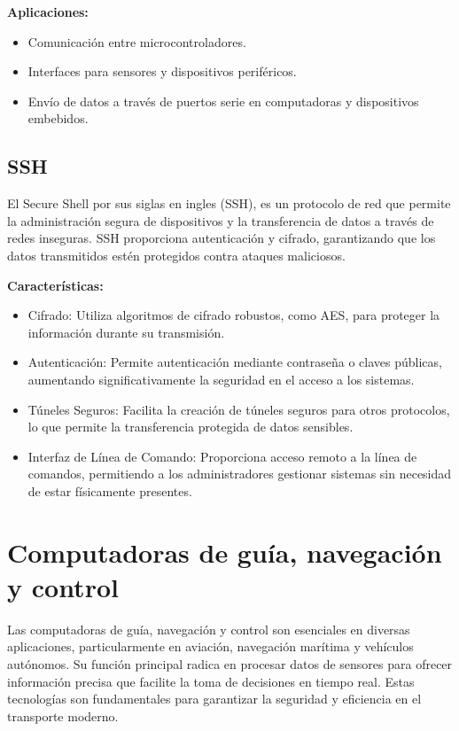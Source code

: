 \textbf{Aplicaciones:}

\begin{itemize}
    \item Comunicación entre microcontroladores.
    \item Interfaces para sensores y dispositivos periféricos.
    \item Envío de datos a través de puertos serie en computadoras y dispositivos embebidos.
\end{itemize}

\subsection{SSH}

El Secure Shell por sus siglas en ingles (SSH), es un protocolo de red que permite la administración segura de dispositivos y la transferencia de datos a través de redes inseguras. SSH proporciona autenticación y cifrado, garantizando que los datos transmitidos estén protegidos contra ataques maliciosos.

\textbf{Características:}

\begin{itemize}
    \item Cifrado: Utiliza algoritmos de cifrado robustos, como AES, para proteger la información durante su transmisión.
    \item Autenticación: Permite autenticación mediante contraseña o claves públicas, aumentando significativamente la seguridad en el acceso a los sistemas.
    \item Túneles Seguros: Facilita la creación de túneles seguros para otros protocolos, lo que permite la transferencia protegida de datos sensibles.
    \item Interfaz de Línea de Comando: Proporciona acceso remoto a la línea de comandos, permitiendo a los administradores gestionar sistemas sin necesidad de estar físicamente presentes.
\end{itemize}

\section{Computadoras de guía, navegación y control}

Las computadoras de guía, navegación y control son esenciales en diversas aplicaciones, particularmente en aviación, navegación marítima y vehículos autónomos. Su función principal radica en procesar datos de sensores para ofrecer información precisa que facilite la toma de decisiones en tiempo real. Estas tecnologías son fundamentales para garantizar la seguridad y eficiencia en el transporte moderno.

